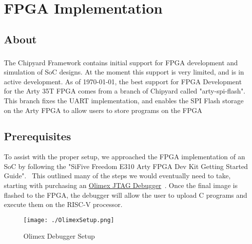 \chapter{FPGA Implementation}\label{chap:FPGA_Implementation}

\section{About}\label{sec:About}
\paragraph{}The Chipyard Framework contains initial support for FPGA development and simulation of SoC designs. 
At the moment this support is very limited, and is in active development. 
As of \today, the best support for FPGA Development for the Arty 35T FPGA comes from a branch of Chipyard called "arty-spi-flash". 
This branch fixes the UART implementation, and enables the SPI Flash storage on the Arty FPGA to allow users to store programs on the FPGA


\section{Prerequisites}\label{sec:Prerequisites}
To assist with the proper setup, we approached the FPGA implementation of an SoC by following the "SiFive Freedom E310 Arty FPGA Dev Kit Getting Started Guide".~\cite{FreedomDevGuide}
This outlined many of the steps we would eventually need to take, starting with purchasing an \href{https://www.digikey.com/en/products/detail/olimex-ltd/ARM-USB-TINY-H/3471388}{Olimex JTAG Debugger}~\cite{OlimexJTAG}. 
Once the final image is flashed to the FPGA, the debugger will allow the user to upload C programs and execute them on the RISC-V processor. 

\begin{figure}[h!tbp]
  \centering
  \texttt{[image: ./OlimexSetup.png]}
  \caption{Olimex Debugger Setup~\cite[p.~5]{FreedomDevGuide}}
  \label{fig:olimexsetup}
\end{figure}



